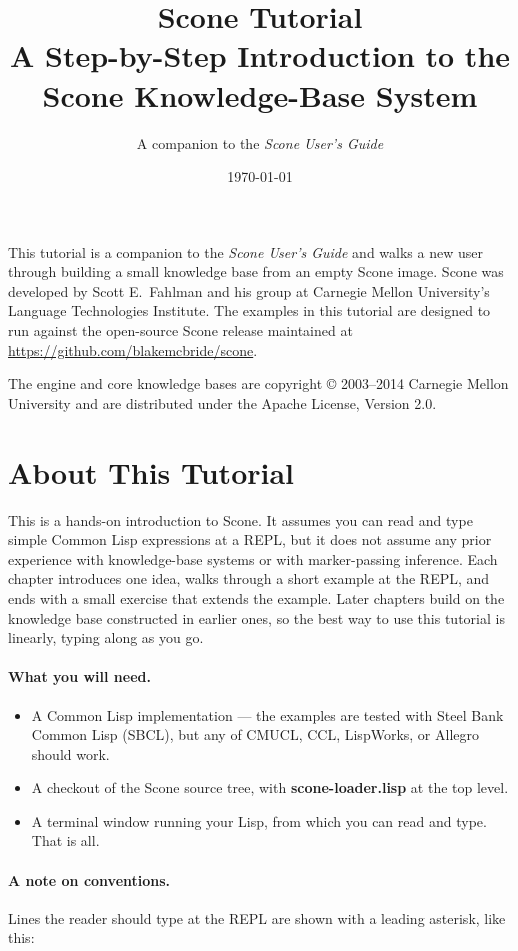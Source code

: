 \documentclass[titlepage,twoside,openright,11pt]{article}
\title{Scone Tutorial\\[6pt]
  \large A Step-by-Step Introduction to the\\
  Scone Knowledge-Base System}
\author{A companion to the \emph{Scone User's Guide}}
\date{\today}
\begin{document}
\maketitle

\noindent
This tutorial is a companion to the \emph{Scone User's Guide} and
walks a new user through building a small knowledge base from an
empty Scone image. Scone was developed by Scott E.\ Fahlman and his
group at Carnegie Mellon University's Language Technologies Institute.
The examples in this tutorial are designed to run against the
open-source Scone release maintained at
\url{https://github.com/blakemcbride/scone}.

The engine and core knowledge bases are copyright \copyright{}
2003--2014 Carnegie Mellon University and are distributed under the
Apache License, Version 2.0.

\cleardoublepage
\tableofcontents
\cleardoublepage

\section{About This Tutorial}\label{about-this-tutorial}

This is a hands-on introduction to Scone. It assumes you can read
and type simple Common Lisp expressions at a REPL, but it does not
assume any prior experience with knowledge-base systems or with
marker-passing inference. Each chapter introduces one idea, walks
through a short example at the REPL, and ends with a small exercise
that extends the example. Later chapters build on the knowledge base
constructed in earlier ones, so the best way to use this tutorial
is linearly, typing along as you go.

\paragraph{What you will need.}
\begin{itemize}
\item
  A Common Lisp implementation --- the examples are tested with Steel
  Bank Common Lisp (SBCL), but any of CMUCL, CCL, LispWorks, or
  Allegro should work.
\item
  A checkout of the Scone source tree, with \textbf{scone-loader.lisp}
  at the top level.
\item
  A terminal window running your Lisp, from which you can read and
  type. That is all.
\end{itemize}

\paragraph{A note on conventions.}
Lines the reader should type at the REPL are shown with a leading
asterisk, like this:
\end{document}
